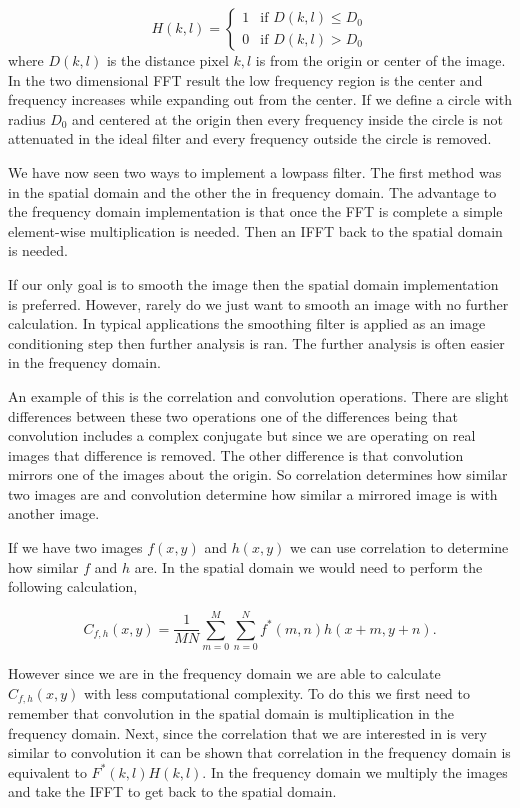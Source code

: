 \begin{equation}
H(k,l) = 
\begin{cases}
1 & \text{if $D(k,l) \leq D_0$}\\
0 & \text{if $D(k,l) > D_0$}
\end{cases}
\end{equation}
\noindent
where $D(k,l)$ is the distance pixel $k,l$ is from the origin or center of the image. In the two dimensional \ac{FFT} result the low frequency region is the center and frequency increases while expanding out from the center. If we define a circle with radius $D_0$ and centered at the origin then every frequency inside the circle is not attenuated in the ideal filter and every frequency outside the circle is removed. 

We have now seen two ways to implement a lowpass filter. The first method was in the spatial domain and the other the in frequency domain. The advantage to the frequency domain implementation is that once the \ac{FFT} is complete a simple element-wise multiplication is needed. Then an \ac{IFFT} back to the spatial domain is needed. 

If our only goal is to smooth the image then the spatial domain implementation is preferred. However, rarely do we just want to smooth an image with no further calculation. In typical applications the smoothing filter is applied as an image conditioning step then further analysis is ran. The further analysis is often easier in the frequency domain.

An example of this is the correlation and convolution operations. There are slight differences between these two operations one of the differences being that convolution includes a complex conjugate but since we are operating on real images that difference is removed. The other difference is that convolution mirrors one of the images about the origin. So correlation determines how similar two images are and convolution determine how similar a mirrored image is with another image. 

If we have two images $f(x,y)$ and $h(x,y)$ we can use correlation to determine how similar $f$ and $h$ are. In the spatial domain we would need to perform the following calculation,

\begin{equation}
C_{f,h}(x,y) = \frac{1}{MN}\sum_{m=0}^{M}\sum_{n=0}^{N}f^*(m,n)h(x+m,y+n).
\end{equation}
\noindent

However since we are in the frequency domain we are able to calculate $C_{f,h}(x,y)$ with less computational complexity. To do this we first need to remember that convolution in the spatial domain is multiplication in the frequency domain. Next, since the correlation that we are interested in is very similar to convolution it can be shown that correlation in the frequency domain is equivalent to $F^*(k,l)H(k,l)$. In the frequency domain we multiply the images and take the \ac{IFFT} to get back to the spatial domain. 

